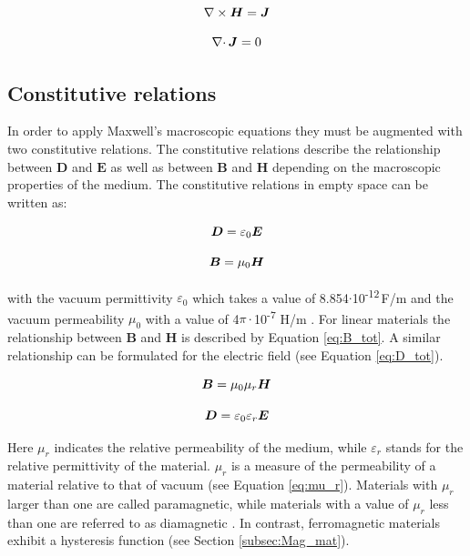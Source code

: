 \begin{equation}
\label{eq:Ampere_stat}
\centering
\nabla\times\boldsymbol{H} = \boldsymbol{J} 
\end{equation}

\begin{equation}
\label{eq:Konti_Mag_stat}
\centering
\nabla\cdotp\boldsymbol{J} = 0
\end{equation}

\subsection{Constitutive relations}
\label{subsec:const_rel}

In order to apply Maxwell's macroscopic equations they must be augmented with two constitutive relations. The constitutive relations describe the relationship between $\boldsymbol{D}$ and $\boldsymbol{E}$ as well as between $\boldsymbol{B}$ and $\boldsymbol{H}$ depending on the macroscopic properties of the medium. The constitutive relations in empty space can be written as: 

\begin{equation}
\label{eq:disp_const_rel}
\centering
\boldsymbol{D} = \varepsilon_{0}\boldsymbol{E} 
\end{equation}

\begin{equation}
\label{eq:B_vac}
\centering
\boldsymbol{B} = \mu_{0}\boldsymbol{H}
\end{equation}

with the vacuum permittivity $\varepsilon_{0}$ which takes a value of 8.854$\cdotp$10\textsuperscript{-12}\,F/m and the vacuum permeability $\mu_{0}$ with a value of 4$\pi\cdotp$10\textsuperscript{-7} H/m \cite{monk2003finite}\cite{kallenbach2018elektromagnete}. For linear materials the relationship between $\boldsymbol{B}$ and $\boldsymbol{H}$ is described by Equation \ref{eq:B_tot}. A similar relationship can be formulated for the electric field (see Equation \ref{eq:D_tot}).    

\begin{equation}
\label{eq:B_tot}
\centering
\boldsymbol{B} = \mu_{0}\mu_{r}\boldsymbol{H}
\end{equation}

\begin{equation}
\label{eq:D_tot}
\centering
\boldsymbol{D} = \varepsilon_{0}\varepsilon_{r}\boldsymbol{E}
\end{equation}

Here $\mu_{r}$ indicates the relative permeability of the medium, while $\varepsilon_{r}$ stands for the relative permittivity of the material. $\mu_{r}$ is a measure of the permeability of a material relative to that of vacuum (see Equation \ref{eq:mu_r}). Materials with $\mu_{r}$ larger than one are called paramagnetic, while materials with a value of $\mu_{r}$ less than one are referred to as diamagnetic \cite{svoboda2004magnetic}. In contrast, ferromagnetic materials exhibit a hysteresis function (see Section \ref{subsec:Mag_mat}).  

